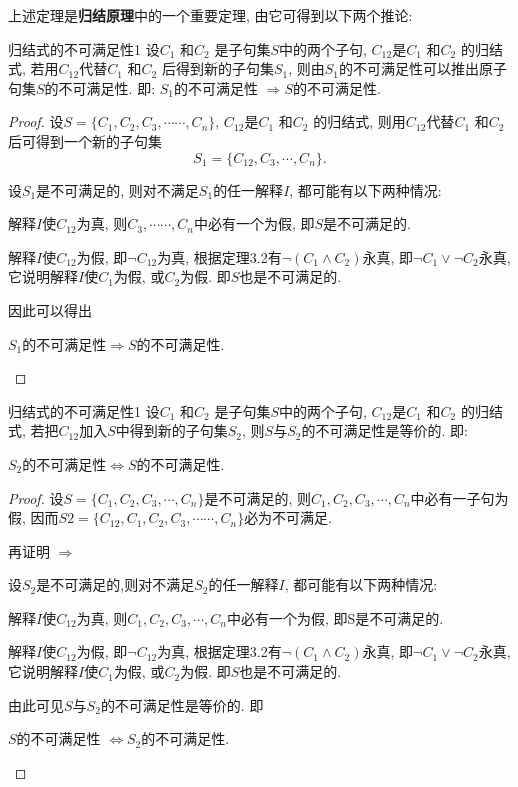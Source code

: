 上述定理是\textbf{归结原理}中的一个重要定理, 由它可得到以下两个推论:
\begin{myprop}{归结式的不可满足性}{1}
设$C_1$ 和$C_2$ 是子句集$S$中的两个子句, $C_{1 2}$是$C_1$ 和$C_2$ 的归结式, 若用$C_{1 2}$代替$C_1$ 和$C_2$ 后得到新的子句集$S_1$, 则由$S_1$的不可满足性可以推出原子句集$S$的不可满足性. 即: $S_1$的不可满足性 $\Rightarrow  S$的不可满足性.
\end{myprop}
\begin{proof}
设$S=\{ C_1 , C_2 , C_3, \cdots \cdots , C_n\}$, $C_{1 2}$是$C_1$ 和$C_2$ 的归结式, 则用$C_{1 2}$代替$C_1$ 和$C_2$ 后可得到一个新的子句集$$S_1=\{C_{1 2}, C_3, \cdots , C_n\}.$$

设$S_1$是不可满足的, 则对不满足$S_1$的任一解释$I$, 都可能有以下两种情况:

  解释$I$使$C_{1 2}$为真, 则$C_3, \cdots \cdots , C_n$中必有一个为假, 即$S$是不可满足的.

  解释$I$使$C_{1 2}$为假, 即$\neg C_{1 2}$为真, 根据定理3.2有$\neg  (C_1 \wedge C_2 )$永真, 即$\neg C_1 \vee \neg C_2 $永真, 它说明解释$I$使$C_1$为假, 或$C_2$为假. 即$S$也是不可满足的.

因此可以得出
\begin{center}
  $S_1$的不可满足性$\Rightarrow S$的不可满足性.
\end{center}
\end{proof}
\begin{myprop}{归结式的不可满足性}{1}
设$C_1$ 和$C_2$ 是子句集$S$中的两个子句, $C_{1 2}$是$C_1$ 和$C_2$ 的归结式, 若把$C_{1 2}$加入$S$中得到新的子句集$S_2$, 则$S$与$S_2$的不可满足性是等价的. 即:
\begin{center}
  $S_2$的不可满足性$\Leftrightarrow S$的不可满足性.
\end{center}\end{myprop}
\begin{proof}
设$S=\{ C_1, C_2, C_3, \cdots , C_n\}$是不可满足的, 则$C_1, C_2, C_3, \cdots , C_n$中必有一子句为假, 因而$S2=\{ C_{12}, C_1, C_2, C_3, \cdots \cdots , C_n\}$必为不可满足.

再证明 $\Rightarrow$

设$S_2$是不可满足的,则对不满足$S_2$的任一解释$I$, 都可能有以下两种情况:

     \quad{} 解释$I$使$C_{1 2}$为真, 则$C_1, C_2, C_3, \cdots , C_n$中必有一个为假, 即S是不可满足的.

     \quad{} 解释$I$使$C_{1 2}$为假, 即$\neg C_{1 2}$为真, 根据定理3.2有$\neg (C_1 \wedge C_2 )$永真, 即$\neg C_1 \vee \neg C_2 $永真, 它说明解释$I$使$C_1$为假, 或$C_2$为假. 即$S$也是不可满足的.

     由此可见$S$与$S_2$的不可满足性是等价的. 即
     \begin{center}
     	$S$的不可满足性 $\Leftrightarrow  S_2$的不可满足性.
     \end{center}
\end{proof}

